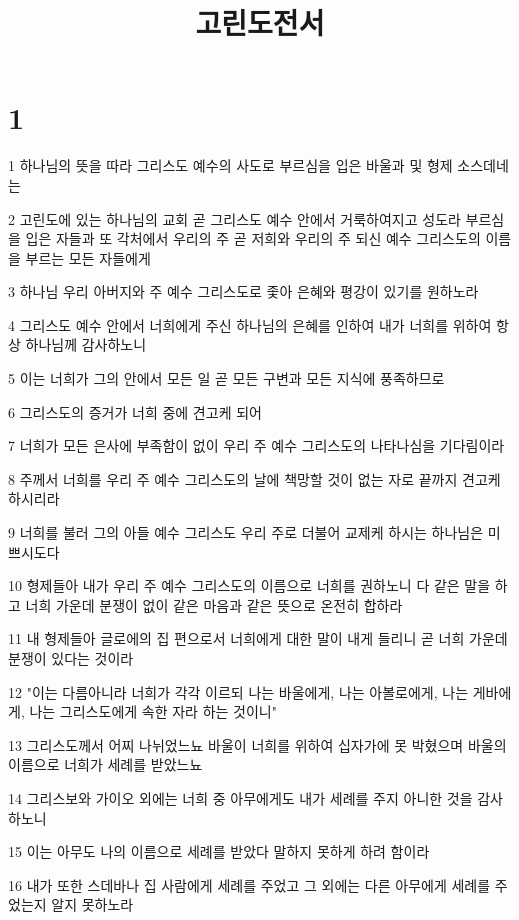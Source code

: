 

\title{고린도전서}


\chapter{1}

\par 1 하나님의 뜻을 따라 그리스도 예수의 사도로 부르심을 입은 바울과 및 형제 소스데네는
\par 2 고린도에 있는 하나님의 교회 곧 그리스도 예수 안에서 거룩하여지고 성도라 부르심을 입은 자들과 또 각처에서 우리의 주 곧 저희와 우리의 주 되신 예수 그리스도의 이름을 부르는 모든 자들에게
\par 3 하나님 우리 아버지와 주 예수 그리스도로 좇아 은혜와 평강이 있기를 원하노라
\par 4 그리스도 예수 안에서 너희에게 주신 하나님의 은혜를 인하여 내가 너희를 위하여 항상 하나님께 감사하노니
\par 5 이는 너희가 그의 안에서 모든 일 곧 모든 구변과 모든 지식에 풍족하므로
\par 6 그리스도의 증거가 너희 중에 견고케 되어
\par 7 너희가 모든 은사에 부족함이 없이 우리 주 예수 그리스도의 나타나심을 기다림이라
\par 8 주께서 너희를 우리 주 예수 그리스도의 날에 책망할 것이 없는 자로 끝까지 견고케 하시리라
\par 9 너희를 불러 그의 아들 예수 그리스도 우리 주로 더불어 교제케 하시는 하나님은 미쁘시도다
\par 10 형제들아 내가 우리 주 예수 그리스도의 이름으로 너희를 권하노니 다 같은 말을 하고 너희 가운데 분쟁이 없이 같은 마음과 같은 뜻으로 온전히 합하라
\par 11 내 형제들아 글로에의 집 편으로서 너희에게 대한 말이 내게 들리니 곧 너희 가운데 분쟁이 있다는 것이라
\par 12 "이는 다름아니라 너희가 각각 이르되 나는 바울에게, 나는 아볼로에게, 나는 게바에게, 나는 그리스도에게 속한 자라 하는 것이니"
\par 13 그리스도께서 어찌 나뉘었느뇨 바울이 너희를 위하여 십자가에 못 박혔으며 바울의 이름으로 너희가 세례를 받았느뇨
\par 14 그리스보와 가이오 외에는 너희 중 아무에게도 내가 세례를 주지 아니한 것을 감사하노니
\par 15 이는 아무도 나의 이름으로 세례를 받았다 말하지 못하게 하려 함이라
\par 16 내가 또한 스데바나 집 사람에게 세례를 주었고 그 외에는 다른 아무에게 세례를 주었는지 알지 못하노라
